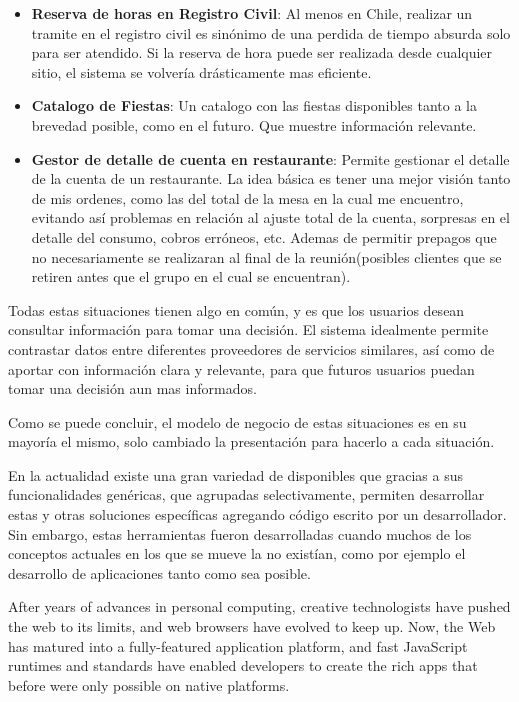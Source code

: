 \begin{itemize}
	\item \textbf{Reserva de horas en Registro Civil}: Al menos en Chile, realizar un tramite en el registro civil es sinónimo de una perdida de tiempo absurda solo para ser atendido. Si la reserva de hora puede ser realizada desde cualquier sitio, el sistema se volvería drásticamente mas eficiente.
	
	\item \textbf{Catalogo de Fiestas}: Un catalogo con las fiestas disponibles tanto a la brevedad posible, como en el futuro. Que muestre información relevante.
	
	\item \textbf{Gestor de detalle de cuenta en restaurante}: Permite gestionar el detalle de la cuenta de un restaurante. La idea básica es tener una mejor visión tanto de mis ordenes, como las del total de la mesa en la cual me encuentro, evitando así problemas en relación al ajuste total de la cuenta, sorpresas en el detalle del consumo, cobros erróneos, etc. Ademas de permitir prepagos que no necesariamente se realizaran al final de la reunión(posibles clientes que se retiren antes que el grupo en el cual se encuentran).
	
\end{itemize}

Todas estas situaciones tienen algo en común, y es que los usuarios desean consultar información para tomar una decisión. El sistema idealmente permite contrastar datos entre diferentes proveedores de servicios similares, así como de aportar con información clara y relevante, para que futuros usuarios puedan tomar una decisión aun mas informados.

Como se puede concluir, el modelo de negocio de estas situaciones es en su mayoría el mismo, solo cambiado la presentación para hacerlo \adhoc a cada situación.

En la actualidad existe una gran variedad de \frameworks disponibles que gracias a sus funcionalidades genéricas, que agrupadas selectivamente, permiten  desarrollar estas y otras soluciones específicas agregando código escrito por un desarrollador. Sin embargo, estas herramientas fueron desarrolladas cuando muchos de los conceptos actuales en los que se mueve la \internet no existían, como por ejemplo el desarrollo de aplicaciones \realtime tanto como sea posible.

After years of advances in personal computing, creative technologists have pushed the web to its limits, and web browsers have evolved to keep up. Now, the Web has matured into a fully-featured application platform, and fast JavaScript runtimes and \htmlfive standards have enabled developers to create the rich apps that before were only possible on native platforms.

